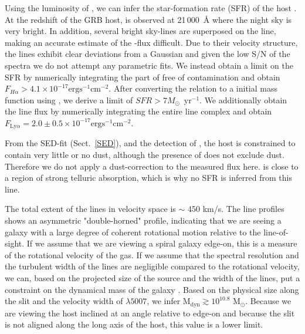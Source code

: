 \documentclass{aa}    %
\begin{document}
Using the luminosity of \ha, we can infer the star-formation rate (SFR) of the
host \citep{Kennicutt1998}. At the redshift of the GRB host, \ha{} is observed
at 21\,000~\AA{} where the night sky is very bright. In addition, several bright
sky-lines are superposed on the line, making an accurate estimate of the
\ha-flux difficult. Due to their velocity structure, the lines exhibit clear
deviations from a Gaussian and given the low S/N of the spectra we do not
attempt any parametric fits. We instead obtain a limit on the SFR by numerically
integrating the part of \ha{} free of contamination and obtain $F_{H \alpha} >
4.1 \times 10^{-17} \mathrm{erg} \mathrm{s}^{-1} \mathrm{cm}^{-2}$. After
converting the \citet{Kennicutt1998} relation to a \citet{Chabrier2003} initial
mass function using \citet{Madau2014}, we derive a limit of $SFR > 7
M_\odot$~yr$^{-1}$. We additionally obtain the \lya{} line flux by numerically integrating
the entire \lya{} line complex and obtain $F_{\mathrm{Ly}\alpha} = 2.0 \pm 0.5
\times 10^{-17} \mathrm{erg} \mathrm{s}^{-1} \mathrm{cm}^{-2}$.  


From the SED-fit (Sect.~\ref{SED}), and the detection of \lya{}, the host is
constrained to contain very little or no dust, although the presence of \lya{}
does not exclude dust. Therefore we do not apply a dust-correction to the
measured \ha{} flux here. \oii{} is close to a region of strong telluric
absorption, which is why no SFR is inferred from this line.

The total extent of the lines in velocity space is $\sim$ 450 km/s. The line
profiles shows an asymmetric "double-horned" profile, indicating that we are
seeing a galaxy with a large degree of coherent rotational motion relative to
the line-of-sight. If we assume that we are viewing a spiral galaxy edge-on,
this is a measure of the rotational velocity of the gas. If we assume that the
spectral resolution and the turbulent width of the lines are negligible compared
to the rotational velocity, we can, based on the projected size of the source
and the width of the lines, put a constraint on the dynamical mass of the galaxy
\citep{DeBlok2014}. Based on the physical size along the slit and the velocity
width of \oiii$\lambda5007$, we infer M$_\text{dyn} \gtrsim 10^{10.8}$
M$_\odot$. Because we are viewing the host inclined at an angle relative to
edge-on and because the slit is not aligned along the long axis of the host,
this value is a lower limit. 
\end{document}
